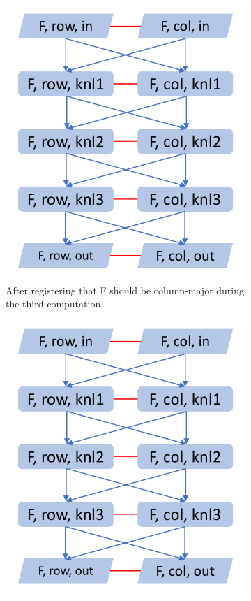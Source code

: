 \documentclass[sigconf,review=true]{acmart}
\begin{document}
\begin{figure}
	\begin{subfigure}[t]{0.2\textwidth}
		\includegraphics[page=3,width=\textwidth]{ModelProgression.pdf}
		\caption{After registering that F should be column-major during the third computation.}
		\label{graphModel:3}
	\end{subfigure}
	\hspace{0.05\textwidth}
	\begin{subfigure}[t]{0.2\textwidth}
		\includegraphics[page=4,width=\textwidth]{ModelProgression.pdf}

\end{subfigure}
\end{figure}
\end{document}
